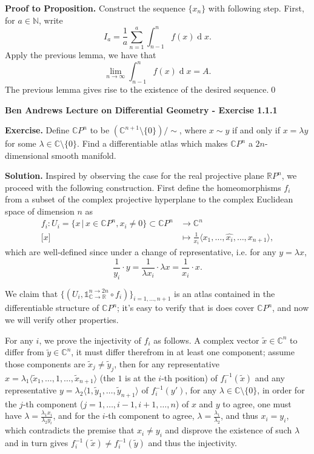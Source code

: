 \documentclass[10pt]{article}
\begin{document}
\begin{CJK*}{UTF8}{gbsn}
\textbf{Proof to Proposition.} Construct the sequence $\{x_n\}$ with following step. First, for $a\in\mathbb{N}$, write $$I_a=\frac{1}{a}\sum_{n=1}^a\int_{n-1}^nf(x)\operatorname{d}x.$$ Apply the previous lemma, we have that $$\lim_{n\to\infty}\int_{n-1}^nf(x)\operatorname{d}x=A.$$ The previous lemma gives rise to the existence of the desired sequence.\qed

\newpage
\textbf{Ben Andrews Lecture on Differential Geometry - Exercise 1.1.1}

\textbf{Exercise.} Define $\mathbb{C}P^n$ to be $(\mathbb{C}^{n+1}\setminus\{0\})/\sim$, where $x\sim y$ if and only if $x=\lambda y$ for some $\lambda\in\mathbb{C}\setminus\{0\}$. Find a differentiable atlas which makes $\mathbb{C}P^n$ a $2n$-dimensional smooth manifold.

\textbf{Solution.} Inspired by observing the case for the real projective plane $\mathbb{R}P^n$, we proceed with the following construction. First define the homeomorphisms $f_i$ from a subset of the complex projective hyperplane to the complex Euclidean space of dimension $n$ as \begin{align*}f_i:U_i=\{x\,\big|\,x\in\mathbb{C}P^n,x_i\neq0\}\subset\mathbb{C}P^n&\to\mathbb{C}^n\\\lbrack x\rbrack&\mapsto\frac{1}{x_i}\langle x_1,\dots,\widehat{x_i},\dots,x_{n+1}\rangle,\end{align*} which are well-defined since under a change of representative, i.e. for any $y=\lambda x$, $$\frac{1}{y_i}\cdot y=\frac{1}{\lambda x_i}\cdot\lambda x=\frac{1}{x_i}\cdot x.$$

We claim that $\{(U_i,\mathbb{1}^{n\to2n}_{\mathbb{C}\to\mathbb{R}}\circ f_i)\}_{i=1,\dots,n+1}$ is an atlas contained in the differentiable structure of $\mathbb{C}P^n$; it's easy to verify that is does cover $\mathbb{C}P^n$, and now we will verify other properties.

For any $i$, we prove the injectivity of $f_i$ as follows. A complex vector $\tilde{x}\in\mathbb{C}^n$ to differ from $\tilde{y}\in\mathbb{C}^n$, it must differ therefrom in at least one component; assume those components are $\tilde{x}_j\neq\tilde{y}_j$, then for any representative $x=\lambda_1\langle\tilde{x}_1,\dots,1,\dots,\tilde{x}_{n+1}\rangle$ (the $1$ is at the $i$-th position) of $f_i^{-1}(\tilde{x})$ and any representative $y=\lambda_2\langle1,\tilde{y}_1,\dots,\tilde{y}_{n+1}\rangle$ of $f_i^{-1}(y')$, for any $\lambda\in\mathbb{C}\setminus\{0\}$, in order for the $j$-th component ($j=1,\dots,i-1,i+1,\dots,n$) of $x$ and $y$ to agree, one must have $\lambda=\frac{\lambda_1x_i}{\lambda_2y_i}$, and for the $i$-th component to agree, $\lambda=\frac{\lambda_1}{\lambda_2}$, and thus $x_i=y_i$, which contradicts the premise that $x_i\neq y_i$ and disprove the existence of such $\lambda$ and in turn gives $f_i^{-1}(\tilde{x})\neq f_i^{-1}(\tilde{y})$ and thus the injectivity.


\end{CJK*}
\end{document}
